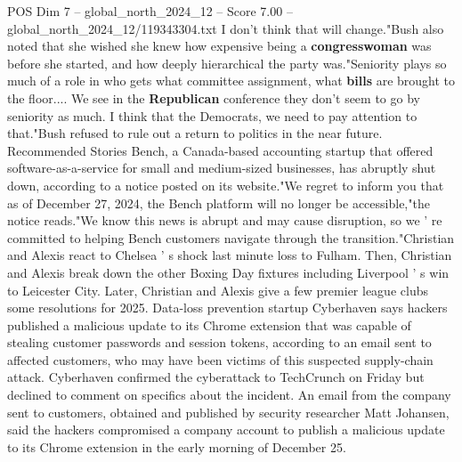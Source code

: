 \begin{textsample}{POS Dim 7 – global\_north\_2024\_12 – Score 7.00 – global\_north\_2024\_12/119343304.txt}
I don't think that will change."Bush also noted that she wished she knew how expensive being a \textbf{congresswoman} was before she started, and how deeply hierarchical the party was."Seniority plays so much of a role in who gets what committee assignment, what \textbf{bills} are brought to the floor....
We see in the \textbf{Republican} conference they don't seem to go by seniority as much.
I think that the Democrats, we need to pay attention to that."Bush refused to rule out a return to politics in the near future.
Recommended Stories Bench, a Canada-based accounting startup that offered software-as-a-service for small and medium-sized businesses, has abruptly shut down, according to a notice posted on its website."We regret to inform you that as of December 27, 2024, the Bench platform will no longer be accessible,"the notice reads."We know this news is abrupt and may cause disruption, so we ' re committed to helping Bench customers navigate through the transition."Christian and Alexis react to Chelsea ' s shock last minute loss to Fulham.
Then, Christian and Alexis break down the other Boxing Day fixtures including Liverpool ' s win to Leicester City.
Later, Christian and Alexis give a few premier league clubs some resolutions for 2025.
Data-loss prevention startup Cyberhaven says hackers published a malicious update to its Chrome extension that was capable of stealing customer passwords and session tokens, according to an email sent to affected customers, who may have been victims of this suspected supply-chain attack.
Cyberhaven confirmed the cyberattack to TechCrunch on Friday but declined to comment on specifics about the incident.
An email from the company sent to customers, obtained and published by security researcher Matt Johansen, said the hackers compromised a company account to publish a malicious update to its Chrome extension in the early morning of December 25.

\end{textsample}
